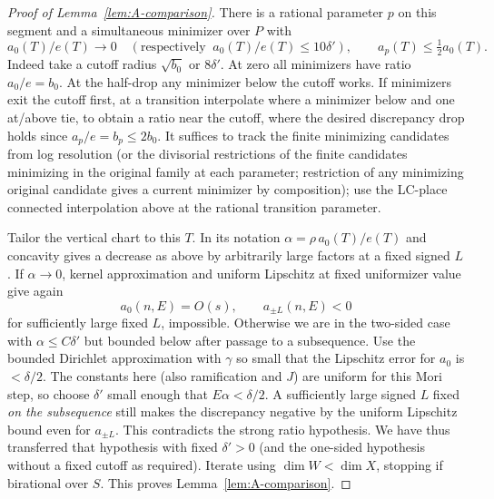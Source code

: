 \begin{proof}[Proof of Lemma~\ref{lem:A-comparison}]
There is a rational parameter \(p\) on this segment and a simultaneous minimizer over \(P\) with
\[
        a_0(T)/e(T)\to0\quad
        (\text{respectively }\ a_0(T)/e(T)\le 10\delta'),\qquad
        a_p(T)\le \tfrac12 a_0(T).
\]
Indeed take a cutoff radius \(\sqrt{b_0}\) or \(8\delta'\).
At zero all minimizers have ratio \(a_0/e=b_0\).
At the half-drop any minimizer below the cutoff works.
If minimizers exit the cutoff first, at a transition interpolate where a minimizer below and one at/above tie, to obtain a ratio near the cutoff, where the desired discrepancy drop holds since \(a_p/e=b_p\le 2b_0\).
It suffices to track the finite minimizing candidates from log resolution (or the divisorial restrictions of the finite candidates minimizing in the original family at each parameter; restriction of any minimizing original candidate gives a current minimizer by composition); use the LC-place connected interpolation above at the rational transition parameter.

Tailor the vertical chart to this \(T\).
In its notation \(\alpha=\rho\,a_0(T)/e(T)\) and concavity gives a decrease as above by arbitrarily large factors at a fixed signed \(L\).
If \(\alpha\to0\), kernel approximation and uniform Lipschitz at fixed uniformizer value give again
\[
                   a_0(n,E)=O(s),\qquad a_{\pm L}(n,E)<0
\]
for sufficiently large fixed \(L\), impossible.
Otherwise we are in the two-sided case with \(\alpha\le C\delta'\) but bounded below after passage to a subsequence.
Use the bounded Dirichlet approximation with \(\gamma\) so small that the Lipschitz error for \(a_0\) is \(<\delta/2\).
The constants here (also ramification and \(J\)) are uniform for this Mori step, so choose \(\delta'\) small enough that \(E\alpha<\delta/2\).
A sufficiently large signed \(L\) fixed \emph{on the subsequence} still makes the discrepancy negative by the uniform Lipschitz bound even for \(a_{\pm L}\).
This contradicts the strong ratio hypothesis.
We have thus transferred that hypothesis with fixed \(\delta'>0\) (and the one-sided hypothesis without a fixed cutoff as required).
Iterate using \(\dim W<\dim X\), stopping if birational over \(S\).
This proves Lemma~\ref{lem:A-comparison}.

\end{proof}

